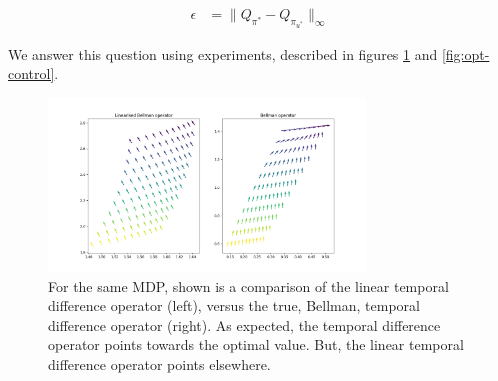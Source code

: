 \begin{align*}
\epsilon &= \parallel Q_{\pi^{* }} - Q_{\pi_{u^{* }}} \parallel_{\infty}
\end{align*}

We answer this question using experiments, described in figures \ref{fig:ltd} and \ref{fig:opt-control}.

\begin{figure}[h!]
\centering
\includegraphics[width=0.75\textwidth,height=0.5\textheight]{../../pictures/figures/LBO_BO.png}
\caption{For the same MDP, shown is a comparison of the linear temporal difference operator (left), versus the true, Bellman, temporal difference operator (right). As expected, the temporal difference operator points towards the optimal value. But, the linear temporal difference operator points elsewhere.}
\label{fig:ltd}
\end{figure}


